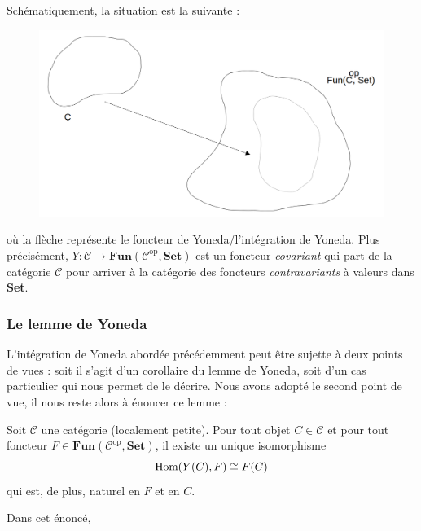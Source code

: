 \documentclass{article}
\begin{document}
\noindent
Schématiquement, la situation est la suivante :

\begin{figure}[H]
\centering
\includegraphics[width=1\textwidth]{emb.png}
\end{figure}

\noindent
où la flèche représente le foncteur de Yoneda/l'intégration de Yoneda. Plus précisément, $Y:\mathcal C\to\textbf{Fun}(\mathcal C^\text{op}, \textbf{Set})$ est un foncteur \textit{covariant} qui part de la catégorie $\mathcal C$ pour arriver à la catégorie des foncteurs \textit{contravariants} à valeurs dans \textbf{Set}.

\subsubsection{Le lemme de Yoneda}
L'intégration de Yoneda abordée précédemment peut être sujette à deux points de vues : soit il s'agit d'un corollaire du lemme de Yoneda, soit d'un cas particulier qui nous permet de le décrire. Nous avons adopté le second point de vue, il nous reste alors à énoncer ce lemme :\\

\begin{lemma}{}
    Soit $\mathcal C$ une catégorie (localement petite). Pour tout objet $C\in\mathcal C$ et pour tout foncteur $F\in\textbf{Fun}(\mathcal C^\text{op}, \textbf{Set})$, il existe un unique isomorphisme $$\text{Hom}(Y(C), F)\cong F(C)$$ qui est, de plus, naturel en $F$ et en $C$.
\end{lemma}

\noindent
Dans cet énoncé,
\end{document}
